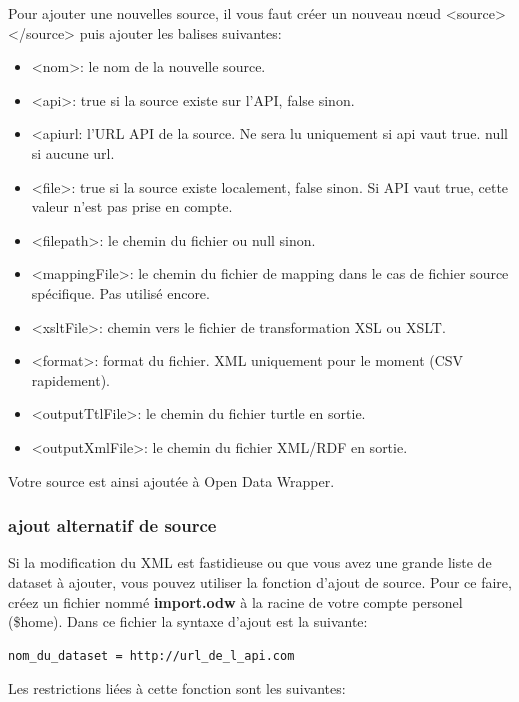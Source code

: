\documentclass[a4paper]{article}
\begin{document}
Pour ajouter une nouvelles source, il vous faut créer un nouveau n\oe{}ud
<source></source> puis ajouter les balises suivantes:
\\

\begin{itemize}
  \item{<nom>}: le nom de la nouvelle source.
  \item{<api>}: true si la source existe sur l'API, false sinon.
  \item{<apiurl}: l'URL API de la source. Ne sera lu uniquement si api vaut
  true. null si aucune url.
  \item{<file>}: true si la source existe localement, false sinon. Si API vaut
  true, cette valeur n'est pas prise en compte.
  \item{<filepath>}: le chemin du fichier ou null sinon.
  \item{<mappingFile>}: le chemin du fichier de mapping dans le cas de fichier
  source spécifique. Pas utilisé encore.
  \item{<xsltFile>}: chemin vers le fichier de transformation XSL ou XSLT.
  \item{<format>}: format du fichier. XML uniquement pour le moment (CSV
  rapidement).
  \item{<outputTtlFile>}: le chemin du fichier turtle en sortie.
  \item{<outputXmlFile>}: le chemin du fichier XML/RDF en sortie.
\end{itemize}

Votre source est ainsi ajoutée à Open Data Wrapper.

\subsubsection{ajout alternatif de source}

Si la modification du XML est fastidieuse ou que vous avez une grande liste de
dataset à ajouter, vous pouvez utiliser la fonction d'ajout de source. Pour ce
faire, créez un fichier nommé \textbf{import.odw} à la racine de votre compte
personel (\$home). Dans ce fichier la syntaxe d'ajout est la suivante: 

\begin{lstlisting}[caption=syntaxe import.odw, language=XML]
nom_du_dataset = http://url_de_l_api.com
\end{lstlisting}

Les restrictions liées à cette fonction sont les suivantes:
\end{document}
